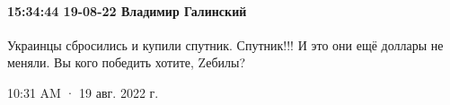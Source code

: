  
 
 
 
 

\paragraph{15:34:44 19-08-22 Владимир Галинский}

Украинцы сбросились и купили спутник. Спутник!!! И это они ещё доллары не
меняли. Вы кого победить хотите, Zебилы?

10:31 AM · 19 авг. 2022 г.

